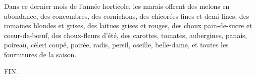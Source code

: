 \documentclass[10pt,a4paper]{book}
\begin{document}
Dans ce dernier mois de l'année horticole, les marais offrent des melons en abondance, des concombres, des cornichons, des chicorées fines et demi-fines, des romaines blondes et grises, des laitues grises et rouges, des choux pain-de-sucre et coeur-de-bœuf, des choux-fleurs d'été, des carottes, tomates, aubergines, panais, poireau, céleri coupé, poirée, radis, persil, oseille, belle-dame, et toutes les fournitures de la saison.

\begin{center}
FIN.
\end{center}

\printindex
\end{document}

